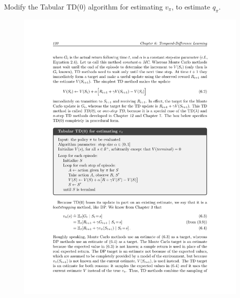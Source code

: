 Modify the Tabular TD(0) algorithm for estimating $v_\pi$, to estimate $q_\pi$. 
%
\begin{figure}[h!]
  \center
\includegraphics[width=0.85\linewidth]{figures/c2m2_td_alg.pdf}
\end{figure}

